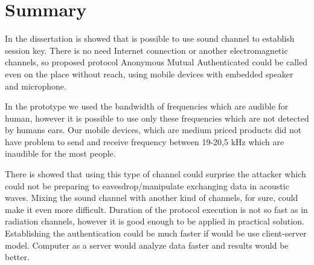\documentclass[11pt,titlepage]{article}
\theoremstyle{plain}
\begin{document}
\section{Summary}

In the dissertation is showed that is possible to use sound channel to establish session key. There is no need Internet connection or another electromagnetic channels, so proposed protocol Anonymous Mutual Authenticated could be called even on the place without reach, using mobile devices with embedded speaker and microphone. 

\vspace{5mm}


In the prototype we used the bandwidth of frequencies which are audible for human, however it is possible to use only these frequencies which are not detected by humans ears. Our mobile devices, which are medium priced products did not have problem to send and receive frequency between 19-20,5 kHz which are inaudible for the most people.

\vspace{5mm}

There is showed that using this type of channel could surprise the attacker which could not be preparing to eavesdrop/manipulate exchanging data in acoustic waves. Mixing the sound channel with another kind of channels, for sure, could make it even more difficult. Duration of the protocol execution is not so fast as in radiation channels, however it is good enough to be applied in practical solution. Establishing the authentication could be much faster if would be use client-server model. Computer as a server would analyze data faster and results would be better.







\end{document}
